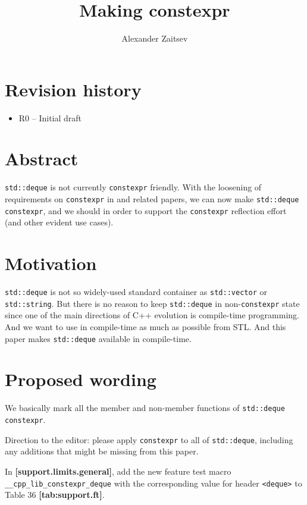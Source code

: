\documentclass{wg21}
\title{Making \cc{std::deque} constexpr}
\author{Alexander Zaitsev}{zamazan4ik@tut.by, zamazan4ik@gmail.com}
\newcommand{\cc}[1]{\texttt{#1}}
\begin{document}
\maketitle

\section{Revision history}
\begin{itemize}
  \item R0 -- Initial draft
\end{itemize}


\section{Abstract}
\cc{std::deque} is not currently \cc{constexpr} friendly. With the loosening
of requirements on \cc{constexpr} in \cite{P0784R1} and related papers, we
can now make \cc{std::deque} \cc{constexpr}, and we should in order to support
the \cc{constexpr} reflection effort (and other evident use cases).

\section{Motivation}
\cc{std::deque} is not so widely-used standard container as \cc{std::vector} or \cc{std::string}. But there is no reason to keep \cc{std::deque} in non-\cc{constexpr} state since one of the main directions of C++ evolution is compile-time programming. And we want to use in compile-time as much as possible from STL. And this paper makes \cc{std::deque} available in compile-time.

\section{Proposed wording}
We basically mark all the member and non-member functions of \cc{std::deque} \cc{constexpr}.

Direction to the editor: please apply \cc{constexpr} to all of \cc{std::deque},
including any additions that might be missing from this paper.

In \textbf{[support.limits.general]}, add the new feature test macro
\cc{__cpp_lib_constexpr_deque} with the corresponding value for header
\cc{<deque>} to Table 36 \textbf{[tab:support.ft]}.
\end{document}
